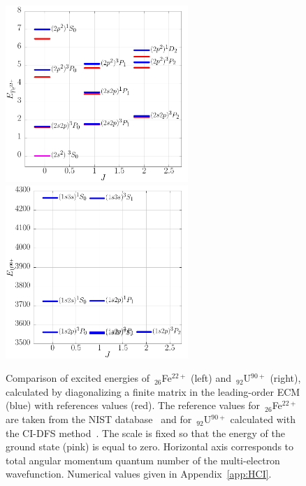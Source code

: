 \begin{figure}
    \centering
    \includegraphics[width=69mm]{Graphs/ExcitedBerylium.pdf}
    \includegraphics[width=69mm]{Graphs/ExcitedUlikeHe.pdf}
    \caption{Comparison of excited energies of~$_{26}$Fe${}^{22+}$ (left) and~${}_{92}$U${}^{90+}$ (right), calculated by diagonalizing a finite matrix in the leading-order ECM (blue) with references values (red). The reference values for~$_{26}$Fe${}^{22+}$ are taken from the NIST database~\cite{NIST} and for~${}_{92}$U${}^{90+}$ calculated with the  CI-DFS method~\cite{Tup2003OS}. The scale is fixed so that the energy of the ground state (pink) is equal to zero. Horizontal axis corresponds to total angular momentum quantum number of the multi-electron wavefunction. Numerical values given in Appendix~\ref{app:HCI}.}
    \label{ExcitedPlot}
\end{figure}


